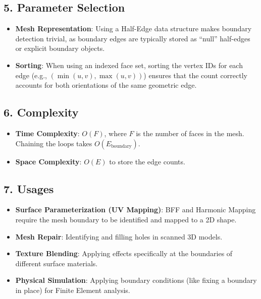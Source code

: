 \subsection{5. Parameter Selection}

\begin{itemize}
    \item \textbf{Mesh Representation}: Using a Half-Edge\cite{guibas1985} data structure makes boundary detection trivial, as boundary edges are typically stored as ``null'' half-edges or explicit boundary objects.
    \item \textbf{Sorting}: When using an indexed face set, sorting the vertex IDs for each edge (e.g., $(\min(u,v), \max(u,v))$) ensures that the count correctly accounts for both orientations of the same geometric edge.
\end{itemize}

\subsection{6. Complexity}

\begin{itemize}
    \item \textbf{Time Complexity}: $O(F)$, where $F$ is the number of faces in the mesh. Chaining the loops takes $O(E_{\text{boundary}})$.
    \item \textbf{Space Complexity}: $O(E)$ to store the edge counts.
\end{itemize}

\subsection{7. Usages}

\begin{itemize}
    \item \textbf{Surface Parameterization (UV Mapping)}: BFF and Harmonic Mapping require the mesh boundary to be identified and mapped to a 2D shape.
    \item \textbf{Mesh Repair}: Identifying and filling holes in scanned 3D models.
    \item \textbf{Texture Blending}: Applying effects specifically at the boundaries of different surface materials.
    \item \textbf{Physical Simulation}: Applying boundary conditions (like fixing a boundary in place) for Finite Element analysis.
\end{itemize}


